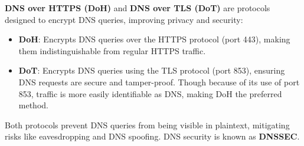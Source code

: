 \begin{Def}

    \textbf{DNS over HTTPS (DoH)} and \textbf{DNS over TLS (DoT)} are protocols designed to encrypt DNS queries, improving privacy and security:
    \begin{itemize}
        \item \textbf{DoH}: Encrypts DNS queries over the HTTPS protocol (port 443), making them indistinguishable from regular HTTPS traffic.
        \item \textbf{DoT}: Encrypts DNS queries using the TLS protocol (port 853), ensuring DNS requests are secure and tamper-proof.
        Though because of its use of port 853, traffic is more easily identifiable as DNS, making DoH the preferred method.
    \end{itemize}

    \noindent
    Both protocols prevent DNS queries from being visible in plaintext, mitigating risks like eavesdropping and DNS spoofing.
    DNS security is known as \textbf{DNSSEC}. \hfill \cite{cloudflare_dns_tls}
\end{Def}











